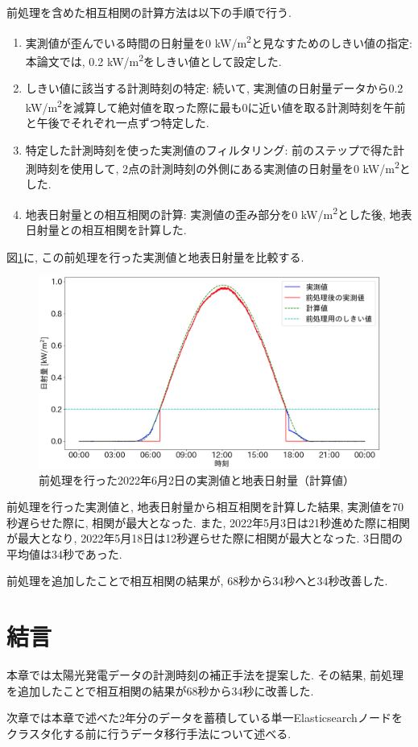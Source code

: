 前処理を含めた相互相関の計算方法は以下の手順で行う.

\begin{enumerate}
  \item 実測値が歪んでいる時間の日射量を0 \si{\kilo\watt}/\si{\metre\squared}と見なすためのしきい値の指定: 本論文では, 0.2 \si{\kilo\watt}/\si{\metre\squared}をしきい値として設定した.
  \item しきい値に該当する計測時刻の特定: 続いて, 実測値の日射量データから0.2 \si{\kilo\watt}/\si{\metre\squared}を減算して絶対値を取った際に最も0に近い値を取る計測時刻を午前と午後でそれぞれ一点ずつ特定した.
  \item 特定した計測時刻を使った実測値のフィルタリング: 前のステップで得た計測時刻を使用して, 2点の計測時刻の外側にある実測値の日射量を0 \si{\kilo\watt}/\si{\metre\squared}とした.
  \item 地表日射量との相互相関の計算: 実測値の歪み部分を0 \si{\kilo\watt}/\si{\metre\squared}とした後, 地表日射量との相互相関を計算した.
\end{enumerate}

図\ref{2-p2}に, この前処理を行った実測値と地表日射量を比較する.

\begin{figure}[H]
  \begin{center}
    \includegraphics[width=140mm]{sotu/figure/2/drop-under-0.2-q.png}
    \caption{前処理を行った2022年6月2日の実測値と地表日射量（計算値）}
    \label{2-p2}
  \end{center}
\end{figure}

前処理を行った実測値と, 地表日射量から相互相関を計算した結果, 実測値を70秒遅らせた際に, 相関が最大となった. また, 2022年5月3日は21秒進めた際に相関が最大となり, 2022年5月18日は12秒遅らせた際に相関が最大となった. 3日間の平均値は34秒であった.

前処理を追加したことで相互相関の結果が, 68秒から34秒へと34秒改善した.

\section{結言}
本章では太陽光発電データの計測時刻の補正手法を提案した. その結果, 前処理を追加したことで相互相関の結果が68秒から34秒に改善した.

次章では本章で述べた2年分のデータを蓄積している単一Elasticsearchノードをクラスタ化する前に行うデータ移行手法について述べる.